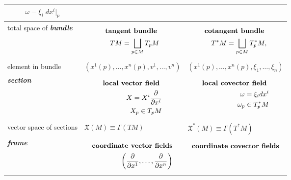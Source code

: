 \documentclass[11pt]{article}
\begin{document}
\begin{table}[h!]
\begin{tabularx}{1\textwidth} { 
  | >{\raggedright\arraybackslash} m{2cm}
  | >{\centering\arraybackslash}X
  | >{\centering\arraybackslash}X  | }
\begin{align*}
 \omega = \xi_{i}\;dx^i\bigr|_{p}
 \end{align*} \vspace{-1em} \\
\hline
total space of \emph{\textbf{bundle}}   & 
\vspace{-1.25em}
\begin{align*}
 \text{\textbf{tangent bundle} }\\
TM =  \bigsqcup_{p\in M}T_{p}M
 \end{align*} 
 & 
 \vspace{-1.25em}
\begin{align*}
 \text{\textbf{cotangent bundle} }\\
T^{*}M =  \bigsqcup_{p\in M}T_{p}^{*}M, 
 \end{align*}\\
\hline
element in bundle &
$(x^1(p), \ldots, x^{n}(p),  v^1, \ldots, v^{n})$
& 
$(x^1(p), \ldots, x^{n}(p),  \xi_1, \ldots, \xi_{n})$ \\
\hline
\emph{\textbf{section}}  &  
\vspace{-1.25em}
\begin{align*}
\text{\textbf{local vector field} }\\
X = X^{i}\frac{\partial }{ \partial x^{i}}\\
X_{p} \in T_{p}M
\end{align*} \vspace{-1.25em}
&
\vspace{-1.25em}
\begin{align*}
\text{\textbf{local covector field} }\\
\omega = \xi_{i} dx^{i}\\
\omega_p \in T_{p}^{*}M
\end{align*} \vspace{-1.25em} \\
\hline
vector space of sections & $\mathfrak{X}(M) \equiv \Gamma(TM)$ & $\mathfrak{X}^{*}(M) \equiv \Gamma(T^{*}M)$ \\
\hline
\emph{\textbf{frame}} 
&
\vspace{-1.25em}
\begin{align*}
\text{\textbf{coordinate vector fields}}\\
\left(\frac{\partial }{ \partial x^{1}}, \ldots, \frac{\partial }{ \partial x^{n}}\right)
\end{align*} \vspace{-1em} &
\vspace{-1.25em}
\begin{align*}
\text{\textbf{coordinate covector fields}}\\

\end{align*}
\end{tabularx}
\end{table}
\end{document}
